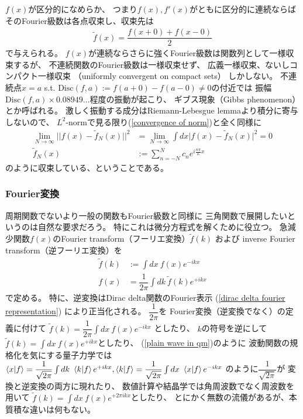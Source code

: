 $f(x)$が区分的になめらか、
つまり$f(x), f'(x)$がともに区分的に連続ならば
そのFourier級数は各点収束し、収束先は
\begin{align}
    \tilde{f}(x) = \dfrac{f(x+0) + f(x-0)}{2}
\end{align}
で与えられる。
$f(x)$が連続ならさらに強くFourier級数は関数列として一様収束するが、
不連続関数のFourier級数は一様収束せず、
広義一様収束、ないしコンパクト一様収束
（uniformly convergent on compact sets）
しかしない。
不連続点$x = a$ s.t.
$\mathrm{Disc}(f,a) := f(a+0) - f(a-0) \neq 0$の付近では
振幅$\mathrm{Disc}(f,a) \times 0.08949\dots$程度の振動が起こり、
ギブス現象（Gibbs phenomenon）とか呼ばれる。
激しく振動する成分はRiemann-Lebesgue lemmaより積分に寄与しないので、
$L^2$-normで見る限り(\ref{convergence of norm})と全く同様に
\begin{subequations}
\begin{align}
    \lim_{N\to\infty}\bigg|\bigg|
        f(x) - \tilde{f}_N(x)
    \bigg|\bigg|^2
    &=
    \lim_{N\to\infty}\int dx
    \Big| f(x) - \tilde{f}_N(x) \Big|^2
    = 0
\\
    \tilde{f}_N(x)
    &:=
    \sum_{n=-N}^N
    c_n e^{ i\frac{n \pi}{L}x }
\end{align}
\end{subequations}
のように収束している、ということである。

\subsubsection{Fourier変換}

周期関数でないより一般の関数もFourier級数と同様に
三角関数で展開したいというのは自然な要求だろう。
特にこれは微分方程式を解くために役立つ。
急減少関数$f(x)$のFourier transform（フーリエ変換）$\tilde{f}(k)$
および
inverse Fourier transform（逆フーリエ変換）を
\begin{subequations}
\begin{align}
    \tilde{f}(k)
    &:=
    \int dx\ f(x) e^{-ikx}
\\
    f(x)
    &=
    \dfrac{1}{2\pi}\int dk\ 
    \tilde{f}(k) e^{+ikx}
\end{align}
\end{subequations}
で定める。
特に、逆変換はDirac delta関数のFourier表示
(\ref{dirac delta fourier representation})
により正当化される。
$\dfrac{1}{2\pi}$を
Fourier変換（逆変換でなく）の定義に付けて
$\tilde{f}(k)=\dfrac{1}{2\pi}\int dx\ f(x) e^{-ikx}$
としたり、
$k$の符号を逆にして
$\tilde{f}(k)=\int dx\ f(x) e^{+ikx}$としたり、
(\ref{plain wave in qm})のように
波動関数の規格化を気にする量子力学では
$
    \braket{ x | f }
    =
    \dfrac{1}{\sqrt{2\pi}}
    \int dk\ \braket{k | f} e^{+ikx}
    ,
    \braket{ k | f }
    =
    \dfrac{1}{\sqrt{2\pi}}
    \int dx\ \braket{x | f} e^{-ikx}
$
のように$\dfrac{1}{\sqrt{2\pi}}$が
変換と逆変換の両方に現れたり、
数値計算や結晶学では角周波数でなく周波数を用いて
$\tilde{f}(k)=\int dx\ f(x) e^{+2\pi ikx}$としたり、
とにかく無数の流儀があるが、本質積な違いは何もない。

